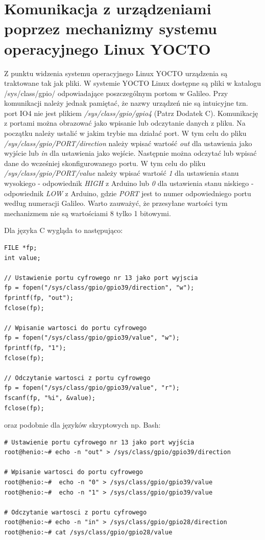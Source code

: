 \documentclass{xmgr}
\begin{document}
\section{Komunikacja z urządzeniami poprzez mechanizmy systemu operacyjnego Linux YOCTO}
Z punktu widzenia systemu operacyjnego Linux YOCTO urządzenia są traktowane tak jak pliki. W systemie YOCTO Linux dostępne są pliki w katalogu /sys/class/gpio/ odpowiadające poszczególnym portom w Galileo. Przy komunikacji należy jednak pamiętać, że nazwy urządzeń nie są intuicyjne tzn. port IO4 nie jest plikiem \emph{/sys/class/gpio/gpio4} (Patrz Dodatek C). Komunikację z portami można obrazować jako wpisanie lub odczytanie danych z pliku. Na początku należy ustalić w jakim trybie ma działać port. W tym celu do pliku \emph{/sys/class/gpio/PORT/direction} należy wpisać wartość \emph{out} dla ustawienia jako wyjście lub \emph{in} dla ustawienia jako wejście. Następnie można odczytać lub wpisać dane do wcześniej skonfigurowanego portu. W tym celu do pliku \emph{/sys/class/gpio/PORT/value} należy wpisać wartość \emph{1} dla ustawienia stanu wysokiego - odpowiednik \emph{HIGH} z Arduino lub \emph{0} dla ustawienia stanu niskiego - odpowiednik \emph{LOW} z Arduino, gdzie \emph{PORT} jest to numer odpowiedniego portu według numeracji Galileo. Warto zauważyć, że przesyłane wartości tym mechanizmem nie są wartościami 8 tylko 1 bitowymi.

Dla języka C wygląda to następująco:
\begin{lstlisting}[label=bot-dirs-alg,caption=Obsługa portu cyfrowego w środowisku Linux (język C)]
FILE *fp;
int value;

// Ustawienie portu cyfrowego nr 13 jako port wyjscia
fp = fopen("/sys/class/gpio/gpio39/direction", "w");
fprintf(fp, "out");
fclose(fp);

// Wpisanie wartosci do portu cyfrowego
fp = fopen("/sys/class/gpio/gpio39/value", "w");
fprintf(fp, "1");
fclose(fp);

// Odczytanie wartosci z portu cyfrowego
fp = fopen("/sys/class/gpio/gpio39/value", "r");
fscanf(fp, "%i", &value);
fclose(fp);
\end{lstlisting}

oraz podobnie dla języków skryptowych np. Bash:

\begin{lstlisting}[label=bot-dirs-alg,caption=Obsługa portu cyfrowego w środowisku Linux (bash)]
# Ustawienie portu cyfrowego nr 13 jako port wyjścia
root@henio:~# echo -n "out" > /sys/class/gpio/gpio39/direction

# Wpisanie wartosci do portu cyfrowego
root@henio:~#  echo -n "0" > /sys/class/gpio/gpio39/value
root@henio:~#  echo -n "1" > /sys/class/gpio/gpio39/value

# Odczytanie wartosci z portu cyfrowego
root@henio:~# echo -n "in" > /sys/class/gpio/gpio28/direction
root@henio:~# cat /sys/class/gpio/gpio28/value
\end{lstlisting}
\end{document}
